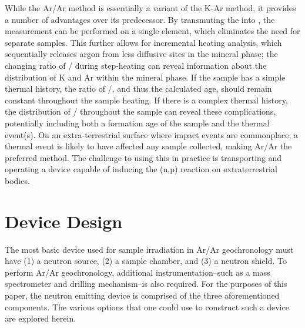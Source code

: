 \documentclass{mc2015}
\begin{document}
While the Ar/Ar method is essentially a variant of the K-Ar method, it provides a number of advantages over its predecessor. By transmuting the  into , the measurement can be performed on a single element, which eliminates the need for separate samples. This further allows for incremental heating analysis, which sequentially releases argon from less diffusive sites in the mineral phase; the changing ratio of / during step-heating can reveal information about the distribution of K and Ar within the mineral phase. If the sample has a simple thermal history, the ratio of /, and thus the calculated age, should remain constant throughout the sample heating. If there is a complex thermal history, the distribution of / throughout the sample can reveal these complications, potentially including both a formation age of the sample and the thermal event(s). On an extra-terrestrial surface where impact events are commonplace, a thermal event is likely to have affected any sample collected, making Ar/Ar the preferred method. The challenge to using this in practice is transporting and operating a device capable of inducing the (n,p) reaction on extraterrestrial bodies.

\section{Device Design}
\label{sec:design}

The most basic device used for sample irradiation in Ar/Ar geochronology must have (1) a neutron source, (2) a sample chamber, and (3) a neutron shield. To perform Ar/Ar geochronology, additional instrumentation--such as a mass spectrometer and drilling mechanism--is also required. For the purposes of this paper, the neutron emitting device is comprised of the three aforementioned components. The various options that one could use to construct such a device are explored herein. 
\end{document}
